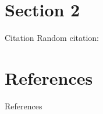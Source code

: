\documentclass[10pt,compress]{beamer}
\begin{document}
\section{Section 2}

\begin{frame}{Citation}
    Random citation: \cite{ANCONS}
\end{frame}

\appendix

\section{References}

\begin{frame}[allowframebreaks]{References}
    
    
\end{frame}
\end{document}
